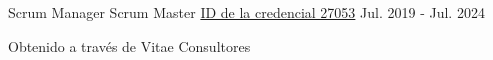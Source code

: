 
\begin{cventries}
  \cventry
    {Scrum Manager}
    {Scrum Master}
    {\href{https://scrummanager.com/website/c/profile/member.php?id=27053}{ID de la credencial 27053}}
    {Jul. 2019 - Jul. 2024}
    {
      \begin{cvitems}
        \item {Obtenido a través de Vitae Consultores}
      \end{cvitems}
    }
\end{cventries}

